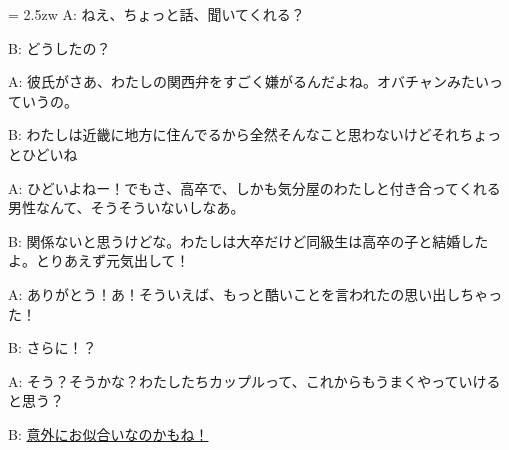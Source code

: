 \documentclass[11pt]{amsart}
\title{}
\author{}
\newenvironment{hangall}[1]{\hangindent = 2.5zw\everypar{\hangindent = 2.5zw}}{}
\begin{document}
\maketitle
\begin{hangall}{}%
A: ねえ、ちょっと話、聞いてくれる？

B: どうしたの？

A: 彼氏がさあ、わたしの関西弁をすごく嫌がるんだよね。オバチャンみたいっていうの。

B: わたしは近畿に地方に住んでるから全然そんなこと思わないけどそれちょっとひどいね

A: ひどいよねー！でもさ、高卒で、しかも気分屋のわたしと付き合ってくれる男性なんて、そうそういないしなあ。

B: 関係ないと思うけどな。わたしは大卒だけど同級生は高卒の子と結婚したよ。とりあえず元気出して！

A: ありがとう！あ！そういえば、もっと酷いことを言われたの思い出しちゃった！

B: さらに！？

A: そう？そうかな？わたしたちカップルって、これからもうまくやっていけると思う？

B: \ul{意外にお似合いなのかもね！}\end{hangall}
\end{document}
